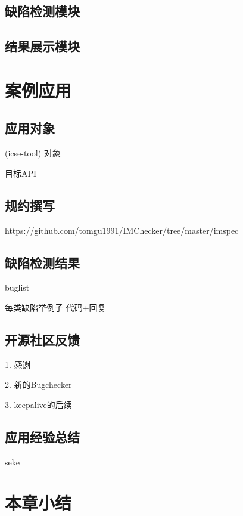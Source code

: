 \subsection{缺陷检测模块}
\subsection{结果展示模块}

\section{案例应用}
\subsection{应用对象}
(icse-tool)
对象

目标API
\subsection{规约撰写}
https://github.com/tomgu1991/IMChecker/tree/master/imspec

\subsection{缺陷检测结果}

buglist

每类缺陷举例子
代码+回复


\subsection{开源社区反馈}
1. 感谢

2. 新的Bugchecker

3. keepalive的后续

\subsection{应用经验总结}

seke

\section{本章小结}
